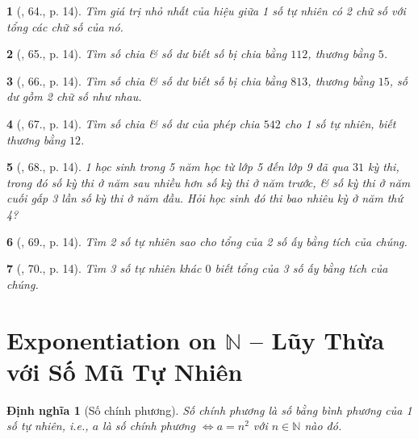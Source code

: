 \documentclass{article}
\newtheorem{baitoan}{}
\newtheorem{dinhnghia}{Định nghĩa}
\begin{document}
\begin{baitoan}[\cite{Binh_Toan_6_tap_1}, 64., p. 14]
	Tìm giá trị nhỏ nhất của hiệu giữa 1 số tự nhiên có 2 chữ số với tổng các chữ số của nó.
\end{baitoan}

\begin{baitoan}[\cite{Binh_Toan_6_tap_1}, 65., p. 14]
	Tìm số chia \& số dư biết số bị chia bằng $112$, thương bằng $5$.
\end{baitoan}

\begin{baitoan}[\cite{Binh_Toan_6_tap_1}, 66., p. 14]
	Tìm số chia \& số dư biết số bị chia bằng $813$, thương bằng $15$, số dư gồm 2 chữ số như nhau.
\end{baitoan}

\begin{baitoan}[\cite{Binh_Toan_6_tap_1}, 67., p. 14]
	Tìm số chia \& số dư của phép chia $542$ cho 1 số tự nhiên, biết thương bằng $12$.
\end{baitoan}

\begin{baitoan}[\cite{Binh_Toan_6_tap_1}, 68., p. 14]
	1 học sinh trong 5 năm học từ lớp 5 đến lớp 9 đã qua $31$ kỳ thi, trong đó số kỳ thi ở năm sau nhiều hơn số kỳ thi ở năm trước, \& số kỳ thi ở năm cuối gấp 3 lần số kỳ thi ở năm đầu. Hỏi học sinh đó thi bao nhiêu kỳ ở năm thứ 4?
\end{baitoan}

\begin{baitoan}[\cite{Binh_Toan_6_tap_1}, 69., p. 14]
	Tìm 2 số tự nhiên sao cho tổng của 2 số ấy bằng tích của chúng.
\end{baitoan}

\begin{baitoan}[\cite{Binh_Toan_6_tap_1}, 70., p. 14]
	Tìm 3 số tự nhiên khác $0$ biết tổng của 3 số ấy bằng tích của chúng.
\end{baitoan}


\section{Exponentiation on $\mathbb{N}$ -- Lũy Thừa với Số Mũ Tự Nhiên}

\begin{dinhnghia}[Số chính phương]
	{\rm Số chính phương} là số bằng bình phương của 1 số tự nhiên, i.e., $a$ là số chính phương $\Leftrightarrow a = n^2$ với $n\in\mathbb{N}$ nào đó.
\end{dinhnghia}
\end{document}

